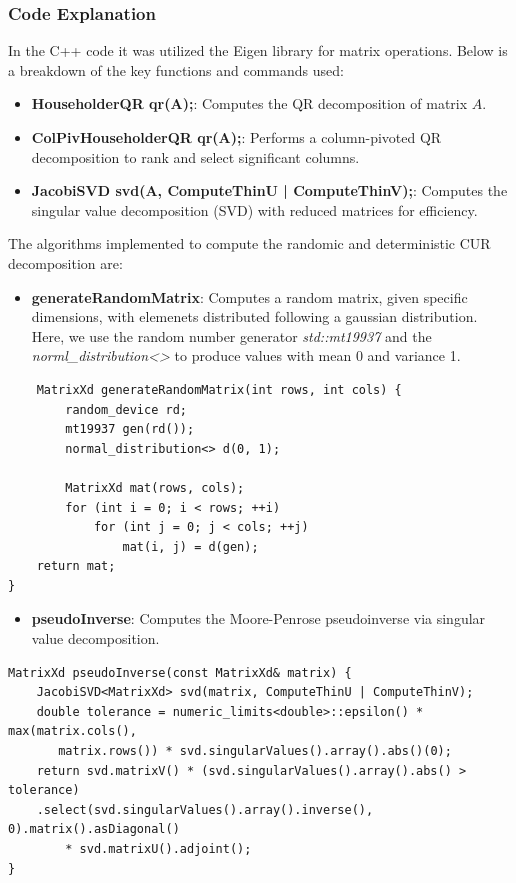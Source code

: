 \documentclass[11pt,a4paper]{article}
\begin{document}
\subsubsection{Code Explanation}
In the C++ code it was utilized the Eigen library for matrix operations. Below is a breakdown of the key functions and commands used:
\begin{itemize}
\item \textbf{HouseholderQR qr(A);}: Computes the QR decomposition of matrix $ A $.
\item \textbf{ColPivHouseholderQR qr(A);}: Performs a column-pivoted QR decomposition to rank and select significant columns.
\item \textbf{JacobiSVD svd(A, ComputeThinU | ComputeThinV);}: Computes the singular value decomposition (SVD) with reduced matrices for efficiency.
\end{itemize}


The algorithms implemented to compute the randomic and deterministic CUR decomposition are:
\begin{itemize}
\item \textbf{generateRandomMatrix}: Computes a random matrix, given specific dimensions, with elemenets distributed following a gaussian distribution. Here, we use the random number generator \textit{std::mt19937} and the \textit{norml\_distribution<>} to produce values with mean 0 and variance 1. 
\end{itemize}
\begin{verbatim}
    MatrixXd generateRandomMatrix(int rows, int cols) {
        random_device rd;
        mt19937 gen(rd());
        normal_distribution<> d(0, 1);
        
        MatrixXd mat(rows, cols);
        for (int i = 0; i < rows; ++i)
            for (int j = 0; j < cols; ++j)
                mat(i, j) = d(gen);
    return mat;
}
\end{verbatim}

\begin{itemize}
    \item \textbf{pseudoInverse}: Computes the Moore-Penrose pseudoinverse via singular value decomposition.
\end{itemize}
\begin{verbatim}
MatrixXd pseudoInverse(const MatrixXd& matrix) {
    JacobiSVD<MatrixXd> svd(matrix, ComputeThinU | ComputeThinV);
    double tolerance = numeric_limits<double>::epsilon() * max(matrix.cols(), 
       matrix.rows()) * svd.singularValues().array().abs()(0);
    return svd.matrixV() * (svd.singularValues().array().abs() > tolerance)
    .select(svd.singularValues().array().inverse(), 0).matrix().asDiagonal() 
        * svd.matrixU().adjoint();
}
\end{verbatim}
\end{document}
